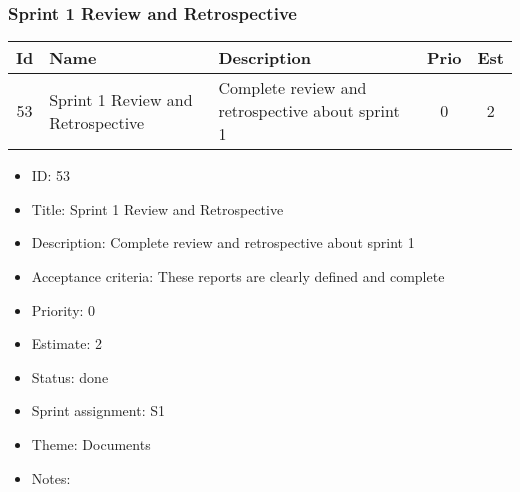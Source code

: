 \newpage
\subsubsection{Sprint 1 Review and Retrospective}
\begin{tabular}{|c|m{1.5cm}|m{4cm}|c|c|}
	\hline
	\textbf{Id}&\textbf{Name}&\textbf{Description}&\textbf{Prio}&\textbf{Est}\\
	\hline
	53 & Sprint 1 Review and Retrospective & 
	Complete review and retrospective about sprint 1 &
	0 & 2 \\
	\hline
\end{tabular}
\begin{itemize}
	\item ID: 53
	\item Title: Sprint 1 Review and Retrospective
	\item Description: Complete review and retrospective about sprint 1
	\item Acceptance criteria: These reports are clearly defined and complete 
	\item Priority: 0
	\item Estimate: 2
	\item Status: done
	\item Sprint assignment: S1
	\item Theme: Documents
	\item Notes:
\end{itemize}

